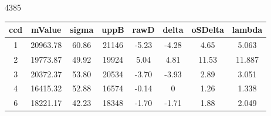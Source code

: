 \documentclass[11pt]{book}
\begin{document}
4385
\begin{table}[!h]
\centering
\begin{tabular}{|c |c |c |c |c |c |c |c |}
\hline ccd & mValue & sigma & uppB & rawD & delta & oSDelta & lambda \\
\hline 1 & 20963.78 & 60.86 & 21146 & -5.23 & -4.28 & 4.65 & 5.063 \\
\hline 2 & 19773.87 & 49.92 & 19924 & 5.04 & 4.81 & 11.53 & 11.887 \\
\hline 3 & 20372.37 & 53.80 & 20534 & -3.70 & -3.93 & 2.89 & 3.051 \\
\hline 4 & 16415.32 & 52.88 & 16574 & -0.14 & 0 & 1.26 & 1.338 \\
\hline 6 & 18221.17 & 42.23 & 18348 & -1.70 & -1.71 & 1.88 & 2.049 \\
\hline

\end{tabular}
\end{table}
\end{document}
